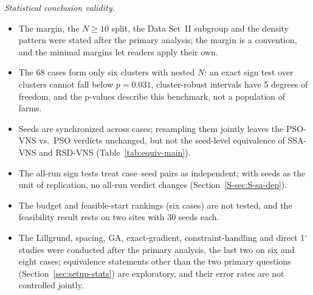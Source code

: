\emph{Statistical conclusion validity.}
\begin{itemize}
\item The margin, the $N\ge10$ split, the Data Set~II subgroup and the density pattern were stated after the primary analysis; the margin is a convention, and the minimal margins let readers apply their own.
\item The 68 cases form only six clusters with nested $N$: an exact sign test over clusters cannot fall below $p=0.031$, cluster-robust intervals have 5 degrees of freedom, and the p-values describe this benchmark, not a population of farms.
\item Seeds are synchronized across cases; resampling them jointly leaves the PSO-VNS vs.\ PSO verdicts unchanged, but not the seed-level equivalence of SSA-VNS and RSD-VNS (Table~\ref{tab:equiv-main}).
\item The all-run sign tests treat case--seed pairs as independent; with seeds as the unit of replication, no all-run verdict changes (Section~\ref{S-sec:S-sa-dep}).
\item The budget and feasible-start rankings (six cases) are not tested, and the feasibility result rests on two sites with 30 seeds each.
\item The Lillgrund, spacing, GA, exact-gradient, constraint-handling and direct 1$^\circ$ studies were conducted after the primary analysis, the last two on six and eight cases; equivalence statements other than the two primary questions (Section~\ref{sec:setup-stats}) are exploratory, and their error rates are not controlled jointly.
\end{itemize}

